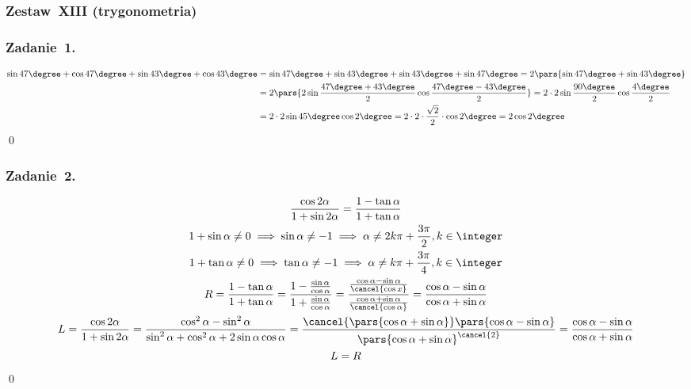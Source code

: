 \subsubsection*{Zestaw~XIII (trygonometria)}
\subsubsection*{Zadanie~1.}
\begin{gather*}
    \begin{split}
        \sin47\degree + \cos47\degree + \sin43\degree + \cos43\degree
            &= \sin47\degree + \sin43\degree + \sin43\degree + \sin47\degree
            = 2\pars{\sin47\degree + \sin43\degree}\\
            &= 2\pars{2\sin\frac{47\degree + 43\degree}{2}\cos\frac{47\degree - 43\degree}{2}}
            = 2 \cdot 2\sin\frac{90\degree}{2}\cos\frac{4\degree}{2}\\
            &= 2 \cdot 2\sin45\degree\cos2\degree
            = 2 \cdot 2 \cdot \frac{\sqrt{2}}{2} \cdot \cos2\degree
            = 2\cos2\degree
    \end{split}
\end{gather*}
\qed
\subsubsection*{Zadanie~2.}
\begin{gather*}
    \frac{\cos2\alpha}{1 + \sin2\alpha} = \frac{1 - \tan\alpha}{1 + \tan\alpha}\\
    1 + \sin\alpha \neq 0 \implies \sin\alpha \neq -1 \implies \alpha \neq 2k\pi + \frac{3\pi}{2}, k \in \integer\\
    1 + \tan\alpha \neq 0 \implies \tan\alpha \neq -1 \implies \alpha \neq k\pi + \frac{3\pi}{4}, k \in \integer\\
    R
        = \frac{1 - \tan\alpha}{1 + \tan\alpha} = \frac{1 - \frac{\sin\alpha}{\cos\alpha}}{1 + \frac{\sin\alpha}{\cos\alpha}}
        = \frac{\frac{\cos\alpha - \sin\alpha}{\cancel{\cos x}}}{\frac{\cos\alpha + \sin\alpha}{\cancel{\cos\alpha}}}
        = \frac{\cos\alpha - \sin\alpha}{\cos\alpha + \sin\alpha}\\
    L
        = \frac{\cos2\alpha}{1 + \sin2\alpha} = \frac{\cos^2\alpha - \sin^2\alpha}{\sin^2\alpha + \cos^2\alpha + 2\sin\alpha\cos\alpha}
        = \frac{\cancel{\pars{\cos\alpha + \sin\alpha}}\pars{\cos\alpha - \sin\alpha}}{\pars{\cos\alpha + \sin\alpha}^{\cancel{2}}}
        = \frac{\cos\alpha - \sin\alpha}{\cos\alpha + \sin\alpha}\\
    L = R
\end{gather*}
\qed
